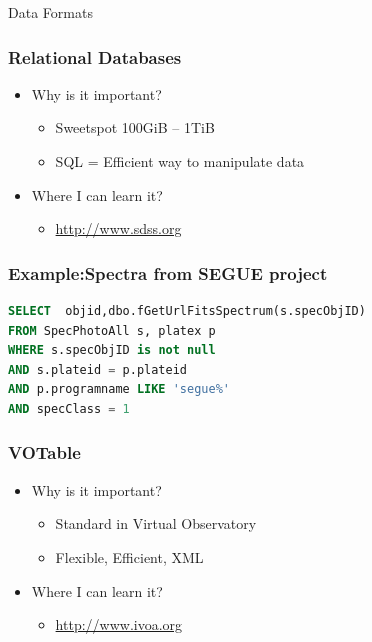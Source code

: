\documentclass[fleqn]{beamer}
\begin{document}
\begin{section}{Data Formats}
  \begin{frame}\frametitle{Relational Databases}
  \begin{itemize}
    \item{Why is it important?}
      \begin{itemize}
      \item Sweetspot 100GiB -- 1TiB
      \item SQL = Efficient way to manipulate data
      \end{itemize}
    \item{Where I can learn it?}
      \begin{itemize}
      \item \url{http://www.sdss.org}
      \end{itemize}
  \end{itemize}
  \end{frame}

\begin{frame}[containsverbatim]\frametitle{Example:Spectra from SEGUE project }
\begin{lstlisting}[language=SQL]
SELECT  objid,dbo.fGetUrlFitsSpectrum(s.specObjID)                                                           
FROM SpecPhotoAll s, platex p                                                                         
WHERE s.specObjID is not null                                                                         
AND s.plateid = p.plateid                                                                             
AND p.programname LIKE 'segue%'                                                                       
AND specClass = 1
\end{lstlisting}
\end{frame}


  \begin{frame}\frametitle{VOTable}
  \begin{itemize}
    \item{Why is it important?}
      \begin{itemize}
      \item Standard in Virtual Observatory
      \item Flexible, Efficient, XML
      \end{itemize}
    \item{Where I can learn it?}
      \begin{itemize}
      \item \url{http://www.ivoa.org}
      \end{itemize}
  \end{itemize}
  \end{frame}


\end{section}
\end{document}
